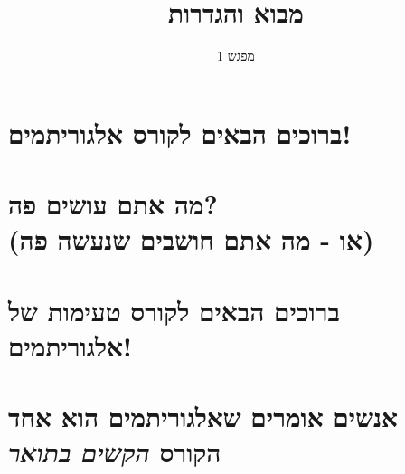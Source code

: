 \documentclass[handout]{beamer}
\begin{document}
	\title{מבוא והגדרות}
	\subtitle{מפגש 1}
	\date{}
	
 \section{ברוכים הבאים לקורס אלגוריתמים!}

\section{מה אתם עושים פה? \\ \large{(או - מה אתם חושבים שנעשה פה)}}
\section{ברוכים הבאים לקורס  טעימות של אלגוריתמים!}
 \section{אנשים אומרים שאלגוריתמים הוא אחד הקורס 
 \textit{הקשים בתואר}
}
\end{document}
